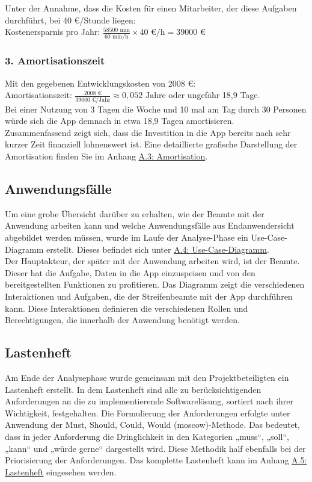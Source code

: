 \documentclass[a4paper,12pt]{article}
\begin{document}
Unter der Annahme, dass die Kosten für einen Mitarbeiter, der diese Aufgaben durchführt, bei 40 €/Stunde liegen:\\
Kostenersparnis pro Jahr: $\frac{58500 \text{ min}}{60 \text{ min/h}} \times 40 \text{ €/h} = 39000 \text{ €}$

\subsubsection*{3. Amortisationszeit}
Mit den gegebenen Entwicklungskosten von 2008 €:\\
Amortisationszeit: $\frac{2008 \text{ €}}{39000 \text{ €/Jahr}} \approx 0,052 \text{ Jahre}$ oder ungefähr 18,9 Tage.\\
Bei einer Nutzung von 3 Tagen die Woche und 10 mal am Tag durch 30 Personen würde sich die App demnach in etwa 18,9 Tagen amortisieren.\\
Zusammenfassend zeigt sich, dass die Investition in die App bereits nach sehr kurzer Zeit finanziell lohnenswert ist. Eine detaillierte grafische Darstellung der Amortisation finden Sie im Anhang \hyperref[sec:amortisation]{A.3: Amortisation}.

\subsection{Anwendungsfälle}
\label{sec:anwendungsfälle}
Um eine grobe Übersicht darüber zu erhalten, wie der Beamte mit der Anwendung arbeiten kann und welche Anwendungsfälle aus Endanwendersicht abgebildet werden müssen, wurde im Laufe der Analyse-Phase ein Use-Case-Diagramm erstellt. Dieses befindet sich unter \hyperref[sec:use-case-diagramm]{A.4: Use-Case-Diagramm}.
\\
Der Hauptakteur, der später mit der Anwendung arbeiten wird, ist der Beamte. Dieser hat die Aufgabe, Daten in die App einzuspeisen und von den bereitgestellten Funktionen zu profitieren. Das Diagramm zeigt die verschiedenen Interaktionen und Aufgaben, die der Streifenbeamte mit der App durchführen kann. Diese Interaktionen definieren die verschiedenen Rollen und Berechtigungen, die innerhalb der Anwendung benötigt werden.

\subsection{Lastenheft}
Am Ende der Analysephase wurde gemeinsam mit den Projektbeteiligten ein Lastenheft erstellt. In dem Lastenheft sind alle zu berücksichtigenden Anforderungen an die zu implementierende Softwarelösung, sortiert nach ihrer Wichtigkeit, festgehalten. Die Formulierung der Anforderungen erfolgte unter Anwendung der Must, Should, Could, Would (\acrshort{moscow})-Methode. Das bedeutet, dass in jeder Anforderung die Dringlichkeit in den Kategorien „muss“, „soll“, „kann“ und „würde gerne“ dargestellt wird\cite{cockburn2001agile}. Diese Methodik half ebenfalls bei der Priorisierung der Anforderungen. Das komplette Lastenheft kann im Anhang \hyperref[sec:lastenheft]{A.5: Lastenheft} eingesehen werden.
\end{document}
